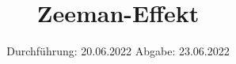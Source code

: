 

\subject{V27}
\title{Zeeman-Effekt}
\date{%
  Durchführung: 20.06.2022
  \hspace{3em}
  Abgabe: 23.06.2022
}



\maketitle
\thispagestyle{empty}
\tableofcontents
\newpage






\printbibliography{}


